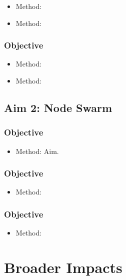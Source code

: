 \documentclass[12pt, oneside]{article}
\begin{document}
\begin{itemize}
 \item Method:
 \item Method:
\end{itemize}

\subsubsection{Objective}

\begin{itemize}
 \item Method:
 \item Method:
\end{itemize}

\subsection{Aim 2: Node Swarm}

\subsubsection{Objective}
\begin{itemize}
 \item Method:
 Aim.
\end{itemize}

\subsubsection{Objective}
\begin{itemize}
 \item Method:
\end{itemize}

\subsubsection{Objective}
\begin{itemize}
 \item Method:
\end{itemize}


\section{Broader Impacts}


%

\end{document}
